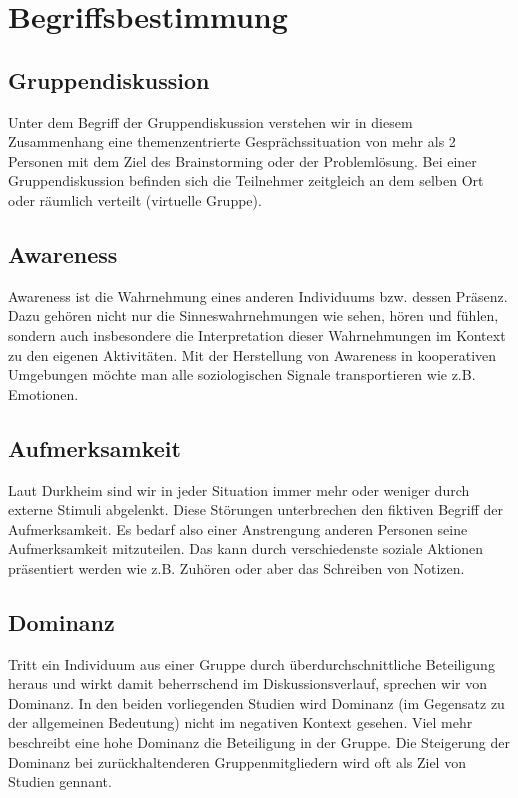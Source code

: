 \documentclass{seminarvorlage}
\begin{document}

\section{Begriffsbestimmung}
\subsection{Gruppendiskussion}
Unter dem Begriff der Gruppendiskussion verstehen wir in diesem Zusammenhang
eine themenzentrierte Gesprächssituation von mehr als 2 Personen mit dem Ziel
des Brainstorming oder der Problemlösung. Bei einer Gruppendiskussion befinden
sich die Teilnehmer zeitgleich an dem selben Ort oder räumlich verteilt
(virtuelle Gruppe).

\subsection{Awareness}
Awareness ist die Wahrnehmung eines anderen Individuums bzw. dessen Präsenz.
Dazu gehören nicht nur die Sinneswahrnehmungen wie sehen, hören und fühlen,
sondern auch insbesondere die Interpretation dieser Wahrnehmungen im Kontext zu
den eigenen Aktivitäten.
Mit der Herstellung von Awareness in kooperativen Umgebungen möchte man alle
soziologischen Signale transportieren wie z.B. Emotionen.

\subsection{Aufmerksamkeit}
Laut Durkheim \cite{Dur1974} sind wir in jeder Situation immer mehr oder weniger
durch externe Stimuli abgelenkt. Diese Störungen unterbrechen den fiktiven
Begriff der Aufmerksamkeit. Es bedarf also einer Anstrengung anderen Personen
seine Aufmerksamkeit mitzuteilen. Das kann durch verschiedenste soziale Aktionen
präsentiert werden wie z.B. Zuhören oder aber das Schreiben von Notizen.

\subsection{Dominanz}
Tritt ein Individuum aus einer Gruppe durch üb\-er\-durch\-schnitt\-liche
Beteiligung heraus und wirkt damit beherrschend im Diskussionsverlauf, sprechen
wir von Dominanz.
In den beiden vorliegenden Studien wird Dominanz (im Gegensatz zu der
allgemeinen Bedeutung) nicht im negativen Kontext gesehen. Viel mehr beschreibt
eine hohe Dominanz die Beteiligung in der Gruppe.
Die Steigerung der Dominanz bei zurückhaltenderen Gruppenmitgliedern wird oft
als Ziel von Studien gennant.
\end{document}
